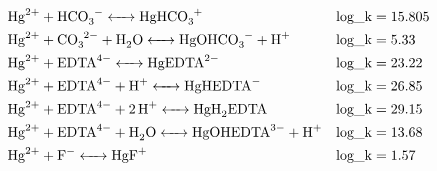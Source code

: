\documentclass[12pt, a4paper]{article}
\begin{document}
\begin{align}
& \ce{Hg^2+ + HCO3^- <-> HgHCO3^+} && \mathrm{log\_k} = 15.805 \\
& \ce{Hg^2+ + CO_3^2- + H2O <-> HgOHCO3^- + H+} && \mathrm{log\_k} = 5.33 \\
& \ce{Hg^2+ + EDTA^4- <-> HgEDTA^2-} && \mathrm{log\_k} = 23.22 \\
& \ce{Hg^2+ + EDTA^4- + H+ <-> HgHEDTA^-} && \mathrm{log\_k} = 26.85 \\
& \ce{Hg^2+ + EDTA^4- + 2H+ <-> HgH2EDTA} && \mathrm{log\_k} = 29.15 \\
& \ce{Hg^2+ + EDTA^4- + H2O <-> HgOHEDTA^3- + H+} && \mathrm{log\_k} = 13.68 \\
& \ce{Hg^2+ + F^- <-> HgF^+} && \mathrm{log\_k} = 1.57
\end{align}
\end{document}
